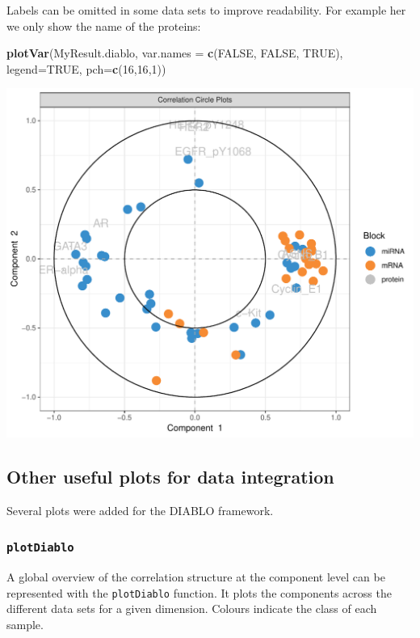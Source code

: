 \documentclass[]{book}
\newenvironment{Shaded}{\begin{snugshade}}{\end{snugshade}}
\newcommand{\DataTypeTok}[1]{\textcolor[rgb]{0.13,0.29,0.53}{#1}}
\newcommand{\DecValTok}[1]{\textcolor[rgb]{0.00,0.00,0.81}{#1}}
\newcommand{\KeywordTok}[1]{\textcolor[rgb]{0.13,0.29,0.53}{\textbf{#1}}}
\newcommand{\NormalTok}[1]{#1}
\newcommand{\OtherTok}[1]{\textcolor[rgb]{0.56,0.35,0.01}{#1}}
\begin{document}
Labels can be omitted in some data sets to improve readability. For example her we only show the name of the proteins:

\begin{Shaded}
\begin{Highlighting}[]
\KeywordTok{plotVar}\NormalTok{(MyResult.diablo, }\DataTypeTok{var.names =} \KeywordTok{c}\NormalTok{(}\OtherTok{FALSE}\NormalTok{, }\OtherTok{FALSE}\NormalTok{, }\OtherTok{TRUE}\NormalTok{),}
        \DataTypeTok{legend=}\OtherTok{TRUE}\NormalTok{, }\DataTypeTok{pch=}\KeywordTok{c}\NormalTok{(}\DecValTok{16}\NormalTok{,}\DecValTok{16}\NormalTok{,}\DecValTok{1}\NormalTok{))}
\end{Highlighting}
\end{Shaded}

\begin{center}\includegraphics[width=0.5\linewidth,]{Figures/06-diablo-plotVar-1} \end{center}

\hypertarget{other-useful-plots-for-data-integration-1}{%
\subsection{Other useful plots for data integration}\label{other-useful-plots-for-data-integration-1}}

Several plots were added for the DIABLO framework.

\hypertarget{plotdiablo}{%
\subsubsection{\texorpdfstring{\texttt{plotDiablo}}{plotDiablo}}\label{plotdiablo}}

A global overview of the correlation structure at the component level can be represented with the \texttt{plotDiablo} function. It plots the components across the different data sets for a given dimension. Colours indicate the class of each sample.
\end{document}
